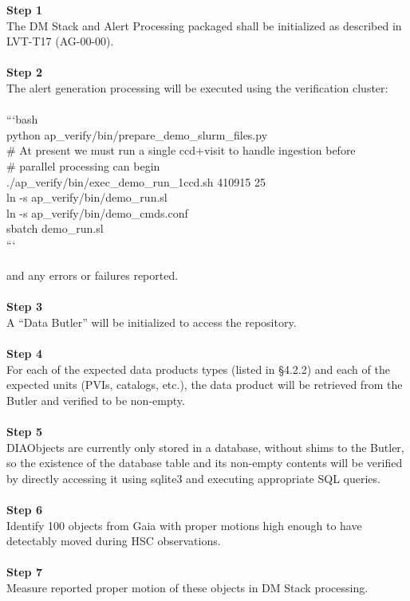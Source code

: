 \textbf{Step 1}\\
The DM Stack and Alert Processing packaged shall be initialized as
described in LVT-T17 (AG-00-00).\\
~\\
\textbf{Step 2}\\
The alert generation processing will be executed using the verification
cluster:\\
~\\
```bash\\
python ap\_verify/bin/prepare\_demo\_slurm\_files.py\\
\# At present we must run a single ccd+visit to handle ingestion
before\\
\# parallel processing can begin\\
./ap\_verify/bin/exec\_demo\_run\_1ccd.sh 410915 25\\
ln -s ap\_verify/bin/demo\_run.sl\\
ln -s ap\_verify/bin/demo\_cmds.conf\\
sbatch demo\_run.sl\\
```\\
~\\
and any errors or failures reported.\\
~\\
\textbf{Step 3}\\
A ``Data Butler'' will be initialized to access the repository.\\
~\\
\textbf{Step 4}\\
For each of the expected data products types (listed in §4.2.2) and each
of the expected units (PVIs, catalogs, etc.), the data product will be
retrieved from the Butler and verified to be non-empty.\\
~\\
\textbf{Step 5}\\
DIAObjects are currently only stored in a database, without shims to the
Butler, so the existence of the database table and its non-empty
contents will be verified by directly accessing it using sqlite3 and
executing appropriate SQL queries.\\
~\\
\textbf{Step 6}\\
Identify 100 objects from Gaia with proper motions high enough to have
detectably moved during HSC observations.\\
~\\
\textbf{Step 7}\\
Measure reported proper motion of these objects in DM Stack processing.
